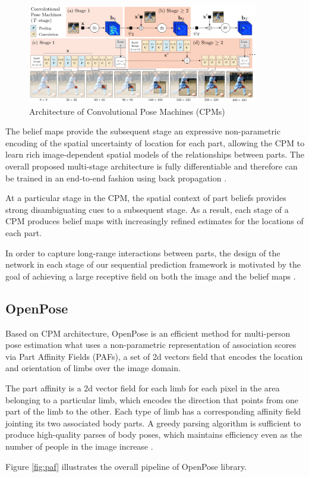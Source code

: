 \begin{figure}[htbp]
\centering\includegraphics[width=0.9\textwidth]{./img/eft.png}
  \caption[Architecture of Convolutional Pose Machines (CPMs)]{Architecture of Convolutional Pose Machines (CPMs) \cite{Wei2016}}\label{fig:eft}
\end{figure}

\par The belief maps provide the subsequent stage an expressive non-parametric encoding of the spatial uncertainty of location for each part, allowing the CPM to learn rich image-dependent spatial models of the relationships between parts. The overall proposed multi-stage architecture is fully differentiable and therefore can be trained in an end-to-end fashion using back propagation \cite{Wei2016}.
\par At a particular stage in the CPM, the spatial context of part beliefs provides strong disambiguating cues to a subsequent stage. As a result, each stage of a CPM produces belief maps with increasingly refined estimates for the locations of each part.
\par In order to capture long-range interactions between parts, the design of the network in each stage of our sequential prediction framework is motivated by the goal of achieving a large receptive field on both the image and the belief maps \cite{Wei2016}.

\subsection*{OpenPose}
\par Based on CPM architecture, OpenPose is an efficient method for multi-person pose estimation what uses a non-parametric representation of association scores via Part Affinity Fields (PAFs), a set of 2d vectors field that encodes the location and orientation of limbs over the image domain.
\par The part affinity is a 2d vector field for each limb for each pixel in the area belonging to a particular limb, which encodes the direction that points from one part of the limb to the other. Each type of limb has a corresponding affinity field jointing its two associated body parts. A greedy parsing algorithm is sufficient to produce high-quality parses of body poses, which maintains efficiency even as the number of people in the image increase \cite{cao2017realtime}.
\par Figure \ref{fig:paf} illustrates the overall pipeline of OpenPose library.

